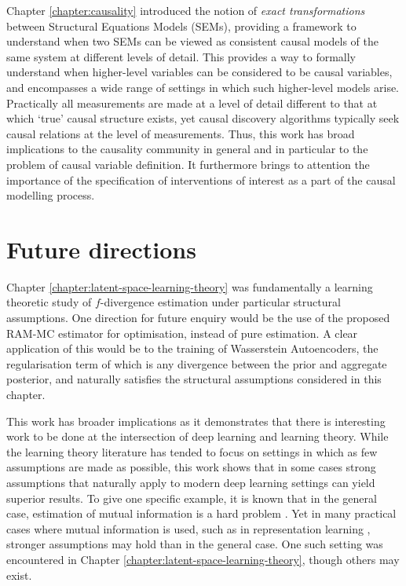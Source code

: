 Chapter \ref{chapter:causality} introduced the notion of \emph{exact transformations} between Structural Equations Models (SEMs), providing a framework to understand when two SEMs can be viewed as consistent causal models of the same system at different levels of detail. 
This provides a way to formally understand when higher-level variables can be considered to be causal variables, and encompasses a wide range of settings in which such higher-level models arise.
Practically all measurements are made at a level of detail different to that at which `true' causal structure exists, yet causal discovery algorithms typically seek causal relations at the level of measurements.
Thus, this work has broad implications to the causality community in general and in particular to the problem of causal variable definition.
It furthermore brings to attention the importance of the specification of interventions of interest as a part of the causal modelling process.


\section{Future directions}

Chapter \ref{chapter:latent-space-learning-theory} was fundamentally a learning theoretic study of $f$-divergence estimation under particular structural assumptions. 
One direction for future enquiry would be the use of the proposed RAM-MC estimator for optimisation, instead of pure estimation. 
A clear application of this would be to the training of Wasserstein Autoencoders, the regularisation term of which is any divergence between the prior and aggregate posterior, and naturally satisfies the structural assumptions considered in this chapter.

This work has broader implications as it demonstrates that there is interesting work to be done at the intersection of deep learning and learning theory. 
While the learning theory literature has tended to focus on settings in which as few assumptions are made as possible, this work shows that in some cases strong assumptions that naturally apply to modern deep learning settings can yield superior results.
To give one specific example, it is known that in the general case, estimation of mutual information is a hard problem \citep{mcallester2018formal}.
Yet in many practical cases where mutual information is used, such as in representation learning \citep{hjelm2018learning, oord2018representation, tschannen2020onmutual}, stronger assumptions may hold than in the general case.
One such setting was encountered in Chapter \ref{chapter:latent-space-learning-theory}, though others may exist.

